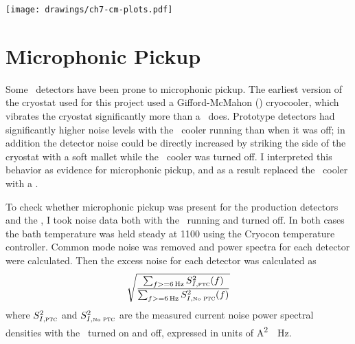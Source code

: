 \begin{figure*}
\texttt{[image: drawings/ch7-cm-plots.pdf]}
\caption{Plots summarizing common mode signal and $1/f$ noise.
\textbf{Upper Left}
Plot showing raw detector output for 15 detectors over a 10-minute data acquisition.
The data was acquired at \SI{15625}{\Hz}, but only every 100th data point is plotted.
\textbf{Upper Right} 
The same data after removal of the common mode signal (as defined in the text).
\textbf{Lower Left} 
Current noise power spectral density for the raw data, the raw data minus the common mode (``No CM''), the raw data minus the common mode and the best-fit 4th-order polynomial (``No CM, Poly''), and the common mode itself (``CM'').
The strong noise peak at \SI{1.411}{\Hz} is due to the \PTC, as explained in the text.
\textbf{Lower Right} 
Raw timestream for , after conversion to an equivalent bath temperature variation, as described in the text.
}
\label{fig:ch7-cm-plots}
\end{figure*}

\section{Microphonic Pickup}


Some \TES\ detectors have been prone to microphonic pickup.
The earliest version of the cryostat used for this project used a Gifford-McMahon (\GM) cryocooler, which vibrates the cryostat significantly more than a \PTC\ does.
Prototype detectors had significantly higher noise levels with the \GM\ cooler running than when it was off; in addition the detector noise could be directly increased by striking the side of the cryostat with a soft mallet while the \GM\ cooler was turned off.
I interpreted this behavior as evidence for microphonic pickup, and as a result replaced the \GM\ cooler with a \PTC.

To check whether microphonic pickup was present for the production detectors and the \PTC, I took noise data both with the \PTC\ running and turned off.
In both cases the bath temperature was held steady at \SI{1100}{\mK} using the Cryocon temperature controller.
Common mode noise was removed and power spectra for each detector were calculated.
Then the excess noise for each detector was calculated as
\begin{equation}
  \sqrt{  \frac{ \sum_{f >= \SI{6}{\Hz}} S^2_{I,\textsc{ptc}}(f) }
               { \sum_{f >= \SI{6}{\Hz}} S^2_{I,\mbox{\tiny{No}}\textsc{ ptc}}(f) }}
\end{equation}
where $S^2_{I,\textsc{ptc}}$ and $S^2_{I,\mbox{\tiny{No}}\textsc{ ptc}}$ are the measured current noise power spectral densities with the \PTC\ turned on and off, expressed in units of \si{\A^2 \per \Hz}.

